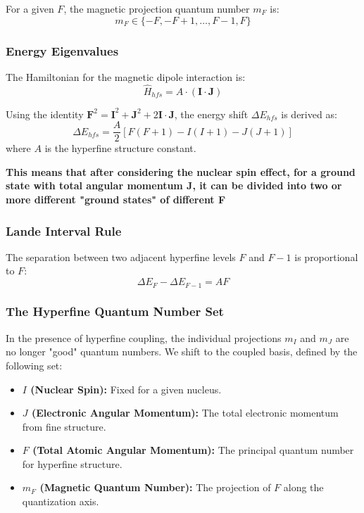 For a given $F$, the magnetic projection quantum number $m_F$ is:
\begin{equation}
	m_F \in \{-F, -F+1, \dots, F-1, F\}
\end{equation}

\subsubsection{Energy Eigenvalues}
The Hamiltonian for the magnetic dipole interaction is:
\begin{equation}
	\hat{H}_{hfs} = A \cdot (\mathbf{I} \cdot \mathbf{J})
\end{equation}

Using the identity $\mathbf{F}^2 = \mathbf{I}^2 + \mathbf{J}^2 + 2\mathbf{I} \cdot \mathbf{J}$, the energy shift $\Delta E_{hfs}$ is derived as:
\begin{equation}
	\Delta E_{hfs} = \frac{A}{2} [F(F+1) - I(I+1) - J(J+1)]
\end{equation}
where $A$ is the hyperfine structure constant.

\textbf{This means that after considering the nuclear spin effect, for a ground state with total angular momentum J, it can be divided into two or more different "ground states" of different F}
\subsubsection{Lande Interval Rule}
The separation between two adjacent hyperfine levels $F$ and $F-1$ is proportional to $F$:
\begin{equation}
	\Delta E_{F} - \Delta E_{F-1} = AF
\end{equation}

\subsubsection{The Hyperfine Quantum Number Set}

In the presence of hyperfine coupling, the individual projections $m_I$ and $m_J$ are no longer "good" quantum numbers. We shift to the coupled basis, defined by the following set:

\begin{itemize}
	\item \textbf{$I$ (Nuclear Spin):} Fixed for a given nucleus. 
	\item \textbf{$J$ (Electronic Angular Momentum):} The total electronic momentum from fine structure.
	\item \textbf{$F$ (Total Atomic Angular Momentum):} The principal quantum number for hyperfine structure. 
	\item \textbf{$m_F$ (Magnetic Quantum Number):} The projection of $F$ along the quantization axis.
\end{itemize}

